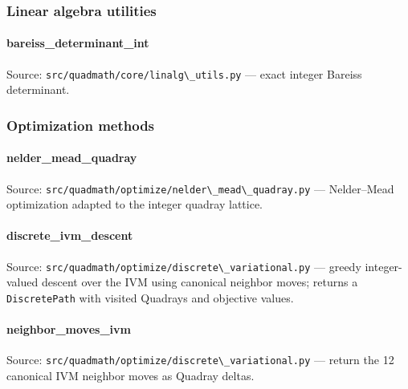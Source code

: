 \documentclass[
  10pt,
]{article}
\newcommand{\passthrough}[1]{#1}
\renewcommand{\texttt}[1]{%
    \colorbox{codebg}{\color{codefg}\ttfamily #1}%
}
\begin{document}
\subsubsection{Linear algebra utilities}\label{code:linear_algebra}

\paragraph{\texorpdfstring{\texttt{bareiss\_determinant\_int}}{bareiss\_determinant\_int}}\label{code:bareiss_determinant_int}

Source: \passthrough{\lstinline!src/quadmath/core/linalg\_utils.py!} ---
exact integer Bareiss determinant.

\subsubsection{Optimization methods}\label{code:optimization}

\paragraph{\texorpdfstring{\texttt{nelder\_mead\_quadray}}{nelder\_mead\_quadray}}\label{code:nelder_mead_quadray}

Source:
\passthrough{\lstinline!src/quadmath/optimize/nelder\_mead\_quadray.py!}
--- Nelder--Mead optimization adapted to the integer quadray lattice.

\paragraph{\texorpdfstring{\texttt{discrete\_ivm\_descent}}{discrete\_ivm\_descent}}\label{code:discrete_ivm_descent}

Source:
\passthrough{\lstinline!src/quadmath/optimize/discrete\_variational.py!}
--- greedy integer-valued descent over the IVM using canonical neighbor
moves; returns a \passthrough{\lstinline!DiscretePath!} with visited
Quadrays and objective values.

\paragraph{\texorpdfstring{\texttt{neighbor\_moves\_ivm}}{neighbor\_moves\_ivm}}\label{code:neighbor_moves_ivm}

Source:
\passthrough{\lstinline!src/quadmath/optimize/discrete\_variational.py!}
--- return the 12 canonical IVM neighbor moves as Quadray deltas.
\end{document}
